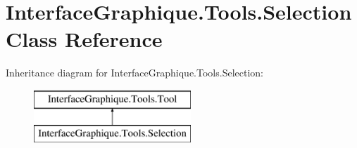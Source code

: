 \hypertarget{class_interface_graphique_1_1_tools_1_1_selection}{}\section{Interface\+Graphique.\+Tools.\+Selection Class Reference}
\label{class_interface_graphique_1_1_tools_1_1_selection}
Inheritance diagram for Interface\+Graphique.\+Tools.\+Selection\+:\begin{figure}[H]
\begin{center}
\leavevmode
\includegraphics[height=2.000000cm]{class_interface_graphique_1_1_tools_1_1_selection}
\end{center}
\end{figure}

